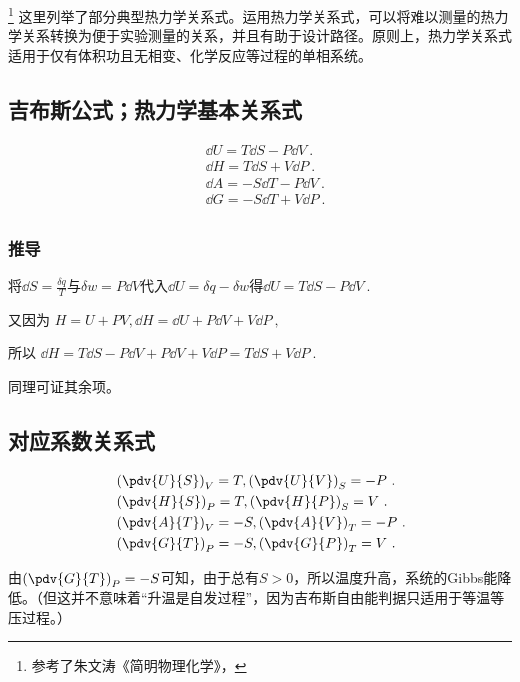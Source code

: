 
\footnote{参考了朱文涛《简明物理化学》，}
这里列举了部分典型热力学关系式。运用热力学关系式，可以将难以测量的热力学关系转换为便于实验测量的关系，并且有助于设计路径。原则上，热力学关系式适用于仅有体积功且无相变、化学反应等过程的单相系统。

\subsection{吉布斯公式；热力学基本关系式}
\begin{align}\label{eq_MWRel_4}
&\dd U = T \dd S - P \dd V~.\\
&\dd H = T \dd S + V \dd P~.\\
&\dd A = -S \dd T - P \dd V~.\\
&\dd G = -S \dd T +V \dd P~.\\
\end{align}

\subsubsection{推导}
将$\dd S = \frac{\delta q}{T}$与$\delta w = P\dd V$代入$\dd U=\delta q-\delta w$得$\dd U = T \dd S - P \dd V~.$

又因为 $H=U+PV, \dd H = \dd U + P \dd V + V \dd P~,$

所以 $\dd H = T \dd S - P \dd V+ P \dd V + V \dd P = T \dd S + V \dd P~.$

同理可证其余项。

\subsection{对应系数关系式}
\begin{align}
&\left(\pdv{U}{S}\right)_V=T, \left(\pdv{U}{V}\right)_S=-P~.
\\
&\left(\pdv{H}{S}\right)_P=T, \left(\pdv{H}{P}\right)_S=V~.
\\
&\left(\pdv{A}{T}\right)_V=-S, \left(\pdv{A}{V}\right)_T=-P~.
\\
&\left(\pdv{G}{T}\right)_P=-S, \left(\pdv{G}{P}\right)_T=V~.
\end{align}

由$\left(\pdv{G}{T}\right)_P=-S$可知，由于总有$S>0$，所以温度升高，系统的Gibbs能降低。（但这并不意味着“升温是自发过程”，因为吉布斯自由能判据只适用于等温等压过程。）

